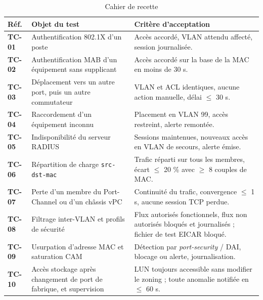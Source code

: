 \documentclass[11pt,a4paper]{article}
\newcommand{\ttb}[1]{\texttt{\small #1}}
\newcommand{\rid}[1]{\textcolor{primary}{\textbf{\small #1}}}
\begin{document}
\begin{table}[H]
\centering
\caption{Cahier de recette}
\begin{tabularx}{\textwidth}{L{1.4cm} L{4.6cm} Y}
\toprule
{}\textbf{Réf.} & \textbf{Objet du test} & \textbf{Critère d'acceptation} \\
\midrule
\rid{TC-01} & Authentification 802.1X d'un poste & Accès accordé, VLAN attendu affecté, session journalisée. \\
\rid{TC-02} & Authentification MAB d'un équipement sans supplicant & Accès accordé sur la base de la MAC en moins de 30 s. \\
\rid{TC-03} & Déplacement vers un autre port, puis un autre commutateur & VLAN et ACL identiques, aucune action manuelle, délai $\leq$ 30 s. \\
\rid{TC-04} & Raccordement d'un équipement inconnu & Placement en VLAN 99, accès restreint, alerte remontée. \\
\rid{TC-05} & Indisponibilité du serveur RADIUS & Sessions maintenues, nouveaux accès en VLAN de secours, alerte émise. \\
\rid{TC-06} & Répartition de charge \ttb{src-dst-mac} & Trafic réparti sur tous les membres, écart $\leq$ 20 \% avec $\geq$ 8 couples de MAC. \\
\rid{TC-07} & Perte d'un membre du Port-Channel ou d'un châssis vPC & Continuité du trafic, convergence $\leq$ 1 s, aucune session TCP perdue. \\
\rid{TC-08} & Filtrage inter-VLAN et profils de sécurité & Flux autorisés fonctionnels, flux non autorisés bloqués et journalisés ; fichier de test EICAR bloqué. \\
\rid{TC-09} & Usurpation d'adresse MAC et saturation CAM & Détection par \textit{port-security} / DAI, blocage ou alerte, journalisation. \\
\rid{TC-10} & Accès stockage après changement de port de fabrique, et supervision & LUN toujours accessible sans modifier le zoning ; toute anomalie notifiée en $\leq$ 60 s. \\
\bottomrule
\end{tabularx}
\end{table}
\end{document}
